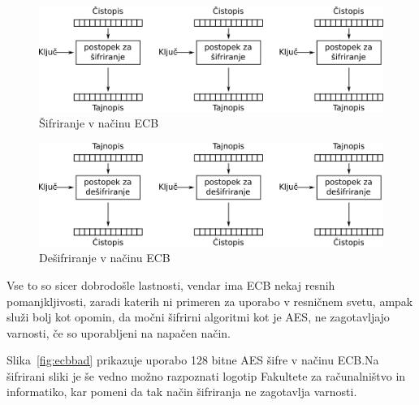 \documentclass[12pt,a4paper,openany,tikz]{book}
\theoremstyle{plain}
\theoremstyle{definition}
\begin{document}
\begin{figure}[ht!]
  \centering
    \includegraphics[width=\textwidth]{images/ECB_encryption}
    \caption{Šifriranje v načinu \gls{ECB}}
\label{fig:ecbenc}
\end{figure}

\begin{figure}[ht!]
  \centering
    \includegraphics[width=\textwidth]{images/ECB_decryption}
    \caption{Dešifriranje v načinu \gls{ECB}}
\label{fig:ecbdec}
\end{figure}


Vse to so sicer dobrodošle lastnosti, vendar ima \gls{ECB} nekaj resnih pomanjkljivosti, zaradi katerih ni primeren za uporabo v resničnem svetu, ampak služi bolj kot opomin, da močni šifrirni algoritmi kot je \gls{AES}, ne zagotavljajo varnosti, če so uporabljeni na napačen način.

Slika~\ref{fig:ecbbad} prikazuje uporabo 128 bitne AES šifre v načinu ECB.\@ Na šifrirani sliki je še vedno možno razpoznati logotip Fakultete za računalništvo in informatiko, kar pomeni da tak način šifriranja ne zagotavlja varnosti.
\end{document}

